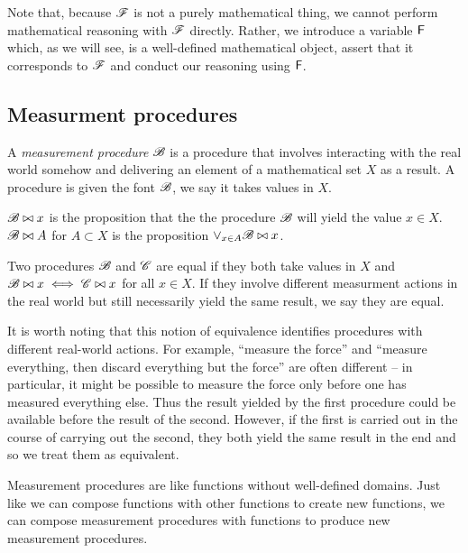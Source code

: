 Note that, because $\mathscr{F}$ is not a purely mathematical thing, we cannot perform mathematical reasoning with $\mathscr{F}$ directly. Rather, we introduce a variable $\mathsf{F}$ which, as we will see, is a well-defined mathematical object, assert that it corresponds to $\mathscr{F}$ and conduct our reasoning using $\mathsf{F}$.

\subsection{Measurment procedures}\label{sec:mprocs}

\begin{definition}
A \emph{measurement procedure} $\mathscr{B}$ is a procedure that involves interacting with the real world somehow and delivering an element of a mathematical set $X$ as a result. A procedure is given the font $\mathscr{B}$, we say it takes values in $X$.
\end{definition}

\begin{definition}
$\mathscr{B}\bowtie x$ is the proposition that the the procedure $\mathscr{B}$ will yield the value $x\in X$. $\mathscr{B}\bowtie A$ for $A\subset X$ is the proposition $\lor_{x\in A} \mathscr{B}\bowtie x$.
\end{definition}

\begin{definition}\label{def:equality}
Two procedures $\mathscr{B}$ and $\mathscr{C}$ are equal if they both take values in $X$ and $\mathscr{B}\bowtie x\iff \mathscr{C}\bowtie x$ for all $x\in X$. If they involve different measurment actions in the real world but still necessarily yield the same result, we say they are equal.
\end{definition}

It is worth noting that this notion of equivalence identifies procedures with different real-world actions. For example, ``measure the force'' and ``measure everything, then discard everything but the force'' are often different -- in particular, it might be possible to measure the force only before one has measured everything else. Thus the result yielded by the first procedure could be available before the result of the second. However, if the first is carried out in the course of carrying out the second, they both yield the same result in the end and so we treat them as equivalent. 

Measurement procedures are like functions without well-defined domains. Just like we can compose functions with other functions to create new functions, we can compose measurement procedures with functions to produce new measurement procedures.

